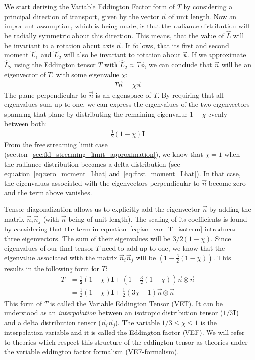 We start deriving the Variable Eddington Factor form of $T$ by considering a principal direction of transport, given by the vector $\vec{n}$ of unit length. Now an important assumption, which is being made, is that the radiance distribution will be radially symmetric about this direction. This means, that the value of $\hat{L}$ will be invariant to a rotation about axis $\vec{n}$. It follows, that its first and second moment $\hat{L}_1$ and $\hat{L}_2$ will also be invariant to rotation about $\vec{n}$. If we approximate $\hat{L}_2$ using the Eddington tensor $T$ with $\hat{L}_2\approx T\phi$, we can conclude that $\vec{n}$ will be an eigenvector of $T$, with some eigenvalue $\chi$:
\begin{align*}
T\vec{n} = \chi\vec{n}
\end{align*}
The plane perpendicular to $\vec{n}$ is an eigenspace of $T$. By requiring that all eigenvalues sum up to one, we can express the eigenvalues of the two eigenvectors spanning that plane by distributing the remaining eigenvalue $1-\chi$ evenly between both:
\begin{align}
\frac{1}{2}\left(1-\chi\right)\mathbf{I}
\label{eq:iso_var_T_isoterm}
\end{align}
From the free streaming limit case (section~\ref{sec:fld_streaming_limit_approximation}), we know that $\chi=1$ when the radiance distribution becomes a delta distribution (see equation~\ref{eq:zero_moment_Lhat} and~\ref{eq:first_moment_Lhat}). In that case, the eigenvalues associated with the eigenvectors perpendicular to $\vec{n}$ become zero and the term above vanishes.

Tensor diagonalization allows us to explicitly add the eigenvector $\vec{n}$ by adding the matrix $\vec{n}_i\vec{n}_j$ (with $\vec{n}$ being of unit length). The scaling of its coefficients is found by considering that the term in equation~\ref{eq:iso_var_T_isoterm} introduces three eigenvectors. The sum of their eigenvalues will be $3/2(1-\chi)$. Since eigenvalues of our final tensor $T$ need to add up to one, we know that the eigenvalue associated with the matrix $\vec{n}_i\vec{n}_j$ will be $\left(1- \frac{3}{2}\left(1 - \chi\right)\right)$. This results in the following form for $T$:
\begin{align}
T &= \frac{1}{2}\left(1-\chi\right)\mathbf{I} + \left(1- \frac{3}{2}\left(1 - \chi\right)\right) \vec{n}\otimes\vec{n}
\nonumber
\\
&= \frac{1}{2}\left(1-\chi\right)\mathbf{I} + \frac{1}{2}\left(3\chi-1\right) \vec{n}\otimes\vec{n}
\label{eq:iso_var_T}
\end{align}
This form of $T$ is called the Variable Eddington Tensor (VET). It can be understood as an \emph{interpolation} between an isotropic distribution tensor ($1/3\mathbf{I}$) and a delta distribution tensor ($\vec{n}_i\vec{n}_j$). The variable $1/3 \le \chi \le 1$ is the interpolation variable and it is called the Eddington factor (VEF). We will refer to theories which respect this structure of the eddington tensor as theories under the variable eddington factor formalism (VEF-formalism).
